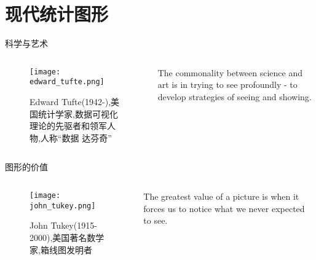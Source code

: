 
\section{现代统计图形}

\begin{frame}{科学与艺术}
  \begin{columns}
    \begin{column}{.4\textwidth}
      \begin{figure}
        \centering \texttt{[image: edward\_tufte.png]}
        \caption{\scriptsize Edward Tufte(1942-),美国统计学家,数据可视化理论的先驱者和领军人物,人称“数据
    达芬奇”}
      \end{figure}
    \end{column}

    \begin{column}{.6\textwidth}
  \begin{ornamentblock}
    {The commonality between science and art is in trying to see profoundly - to develop strategies of seeing and showing.\\
      }
  \end{ornamentblock}
    \end{column}
  \end{columns}
\end{frame}

\begin{frame}{图形的价值}
  \begin{columns}
    \begin{column}{.3\textwidth}
      \begin{figure}
        \centering \texttt{[image: john\_tukey.png]}
        \caption{\scriptsize John Tukey(1915-2000),美国著名数学家,箱线图发明者}
      \end{figure}
    \end{column}

    \begin{column}{.7\textwidth}
  \begin{ornamentblock}
    {The greatest value of a picture is when it forces us to notice what we never expected to see.\\
      }
  \end{ornamentblock}
    \end{column}
  \end{columns}
\end{frame}


